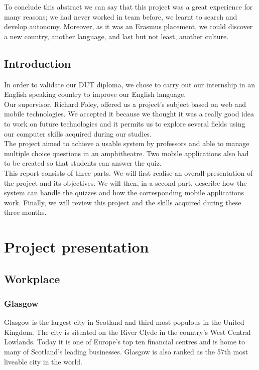 \documentclass{scrreprt}
\begin{document}
		  To conclude this abstract we can say that this project was a great experience for many
		  reasons; we had never worked in team before, we learnt to search and develop
		  autonomy. Moreover, as it was an Erasmus placement, we could discover a new country,
		  another language, and last but not least, another culture.

		  \chapter*{Introduction} %
		  In order to validate our DUT diploma, we chose to carry out our internship in an
		  English speaking country to improve our English language.\\

		  Our supervisor, Richard Foley, offered us a project's subject based on web and mobile
		  technologies. We accepted it because we thought it was a really good idea to work on future
		  technologies and it permits us to explore several fields using our computer skills acquired
		  during our studies.\\

		  The project aimed to achieve a usable system by professors and able to manage
		  multiple choice questions in an amphitheatre. Two mobile applications also had to be
		  created so that students can answer the quiz.\\

		  This report consists of three parts. We will first realise an overall presentation of the
		  project and its objectives. We will then, in a second part, describe how the system can
		  handle the quizzes and how the corresponding mobile applications work. Finally, we will
		  review this project and the skills acquired during these three months.

		  \renewcommand{\contentsname}{Summary}
		  \tableofcontents

		  \part{Project presentation}
		  \chapter{Workplace}
		  \section{Glasgow}%
		  Glasgow is the largest city in Scotland and third most populous in the United
		  Kingdom. The city is situated on the River Clyde in the country's West Central Lowlands.
		  Today it is one of Europe's top ten financial centres and is home to many of
		  Scotland's leading businesses. Glasgow is also ranked as the 57th most liveable city in the
		  world.\\
\end{document}
